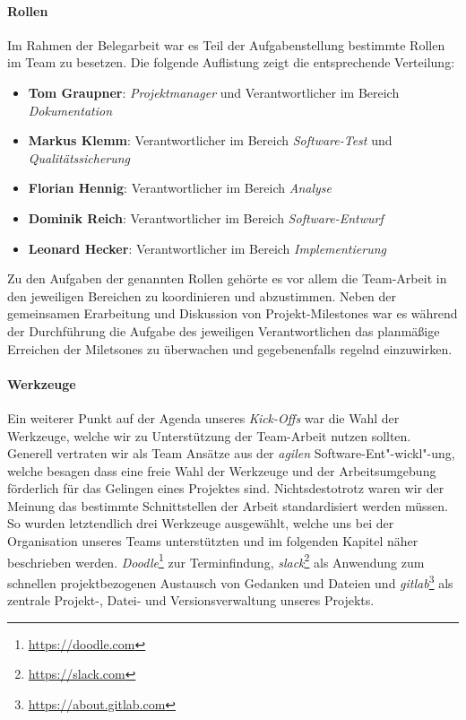 \paragraph{Rollen}Im Rahmen der Belegarbeit war es Teil der Aufgabenstellung bestimmte Rollen im Team zu besetzen. Die folgende Auflistung zeigt die entsprechende Verteilung:

\begin{itemize}
	\item \textbf{Tom Graupner}: \textit{Projektmanager} und Verantwortlicher im Bereich \textit{Dokumentation}
	\item \textbf{Markus Klemm}: Verantwortlicher im Bereich \textit{Software-Test }und \textit{Qualitäts\-sicherung}
	\item \textbf{Florian Hennig}: Verantwortlicher im Bereich \textit{Analyse}
	\item \textbf{Dominik Reich}: Verantwortlicher im Bereich \textit{Software-Entwurf}
	\item \textbf{Leonard Hecker}: Verantwortlicher im Bereich \textit{Implementierung}
\end{itemize}

Zu den Aufgaben der genannten Rollen gehörte es vor allem die Team-Arbeit in den jeweiligen Bereichen zu koordinieren und abzustimmen. Neben der gemeinsamen Erarbeitung und Diskussion von Projekt-Milestones war es während der Durchführung die Aufgabe des jeweiligen Verantwortlichen das planmäßige Erreichen der Miletsones zu überwachen und gegebenenfalls regelnd einzuwirken.

\paragraph{Werkzeuge}Ein weiterer Punkt auf der Agenda unseres \textit{Kick-Offs} war die Wahl der Werkzeuge, welche wir zu Unterstützung der Team-Arbeit nutzen sollten. Generell vertraten wir als Team Ansätze aus der \textit{agilen} Software-Ent"-wickl"-ung, welche besagen dass eine freie Wahl der Werkzeuge und der Arbeitsumgebung förderlich für das Gelingen eines Projektes sind. Nichtsdestotrotz waren wir der Meinung das bestimmte Schnittstellen der Arbeit standardisiert werden müssen. So wurden letztendlich drei Werkzeuge ausgewählt, welche uns bei der Organisation unseres Teams unterstützten und im folgenden Kapitel näher beschrieben werden. \textit{Doodle}\footnote{\url{https://doodle.com}} zur Terminfindung, \textit{slack}\footnote{\url{https://slack.com}} als Anwendung zum schnellen projektbezogenen Austausch von Gedanken und Dateien und \textit{gitlab}\footnote{\url{https://about.gitlab.com}} als zentrale Projekt-, Datei- und Versionsverwaltung unseres Projekts.

